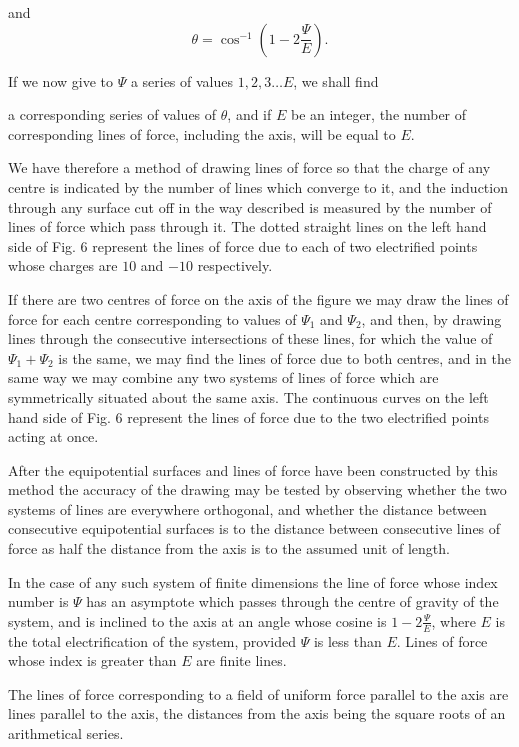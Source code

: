 \documentclass[11pt,a4paper]{article}
\begin{document}
and
\[
\theta=\cos^{-1}\left(1-2\frac{\Psi}{E}\right).
\]

If we now give to $\Psi$ a series of values $1,2,3\ldots E$, we shall find



\setcounter{footnote}{0}
a corresponding series of values of $\theta$, and if $E$ be an integer, the number of corresponding lines of force, including the axis, will be equal to $E$.

We have therefore a method of drawing lines of force so that the charge of any centre is indicated by the number of lines which converge to it, and the induction through any surface cut off in the way described is measured by the number of lines of force which pass through it. The dotted straight lines on the left hand side of Fig. 6 represent the lines of force due to each of two electrified points whose charges are $10$ and $-10$ respectively.

If there are two centres of force on the axis of the figure we may draw the lines of force for each centre corresponding to values of $\Psi_1$ and $\Psi_2$, and then, by drawing lines through the consecutive intersections of these lines, for which the value of $\Psi_1+\Psi_2$ is the same, we may find the lines of force due to both centres, and in the same way we may combine any two systems of lines of force which are symmetrically situated about the same axis. The continuous curves on the left hand side of Fig. 6 represent the lines of force due to the two electrified points acting at once.

After the equipotential surfaces and lines of force have been constructed by this method the accuracy of the drawing may be tested by observing whether the two systems of lines are everywhere orthogonal, and whether the distance between consecutive equipotential surfaces is to the distance between consecutive lines of force as half the distance from the axis is to the assumed unit of length.

In the case of any such system of finite dimensions the line of force whose index number is $\Psi$ has an asymptote which passes through the centre of gravity of the system, and is inclined to the axis at an angle whose cosine is $1-2\frac{\Psi}{E}$, where $E$ is the total electrification of the system, provided $\Psi$ is less than $E$. Lines of force whose index is greater than $E$ are finite lines.

The lines of force corresponding to a field of uniform force parallel to the axis are lines parallel to the axis, the distances from the axis being the square roots of an arithmetical series.
\end{document}
